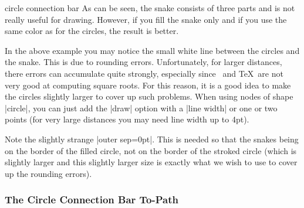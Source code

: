 \begin{snake}{circle connection bar}
  As can be seen, the snake consists of three parts and is not really
  useful for drawing. However, if you fill the snake only and if you
  use the same color as for the circles, the result is better.
\begin{codeexample}[]
\end{codeexample}

  In the above example you may notice the small white line between the
  circles and the snake. This is due to rounding
  errors. Unfortunately, for larger distances, there errors can
  accumulate quite strongly, especially since \tikzname\ and \TeX\ are
  not very good at computing square roots. For this reason, it is a
  good idea to make the circles slightly larger to cover up such
  problems. When using nodes of shape |circle|, you can just add the
  |draw| option with a |line width| or one or two points (for very
  large distances you may need line width up to 4pt). 
\begin{codeexample}[]
\end{codeexample}

  Note the slightly strange |outer sep=0pt|. This is needed so that
  the snakes being on the border of the filled circle, not on the
  border of the stroked circle (which is slightly larger and this
  slightly larger size is exactly what we wish to use to cover up the
  rounding errors).
\end{snake}



\subsubsection{The Circle Connection Bar To-Path}

